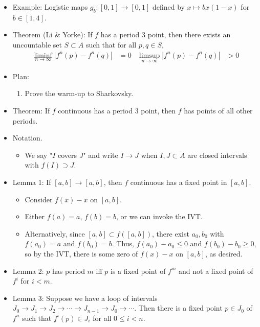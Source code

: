 \documentclass[../notes.tex]{subfiles}
\begin{document}
\begin{itemize}
    \item Example: Logistic maps $g_b:[0,1]\to[0,1]$ defined by $x\mapsto bx(1-x)$ for $b\in[1,4]$.
    \item {}Theorem (Li \& Yorke): If $f$ has a period 3 point, then there exists an uncountable set $S\subset A$ such that for all $p,q\in S$,
    \begin{align*}
        \liminf_{n\to\infty}|f^n(p)-f^n(q)| &= 0&
        \limsup_{n\to\infty}|f^n(p)-f^n(q)| &> 0
    \end{align*}
    \item Plan:
    \begin{enumerate}
        \item Prove the warm-up to Sharkovsky.
    \end{enumerate}
    \item Theorem: If $f$ continuous has a period 3 point, then $f$ has points of all other periods.
    \item Notation.
    \begin{itemize}
        \item We say "$I$ covers $J$" and write $I\to J$ when $I,J\subset A$ are closed intervals with $f(I)\supset J$.
    \end{itemize}
    \item Lemma 1: If $[a,b]\to[a,b]$, then $f$ continuous has a fixed point in $[a,b]$.
    \begin{itemize}
        \item Consider $f(x)-x$ on $[a,b]$.
        \item Either $f(a)=a$, $f(b)=b$, or we can invoke the IVT.
        \item Alternatively, since $[a,b]\subset f([a,b])$, there exist $a_0,b_0$ with $f(a_0)=a$ and $f(b_0)=b$. Thus, $f(a_0)-a_0\leq 0$ and $f(b_0)-b_0\geq 0$, so by the IVT, there is some zero of $f(x)-x$ on $[a,b]$, as desired.
    \end{itemize}
    \item Lemma 2: $p$ has period $m$ iff $p$ is a fixed point of $f^m$ and not a fixed point of $f^i$ for $i<m$.
    \item Lemma 3: Suppose we have a loop of intervals $J_0\to J_1\to J_2\to\cdots\to J_{n-1}\to J_0\to\cdots$. Then there is a fixed point $p\in J_0$ of $f^n$ such that $f^i(p)\in J_i$ for all $0\leq i<n$.
    \begin{figure}[h!]
        \centering
\end{figure}
\end{itemize}
\end{document}
